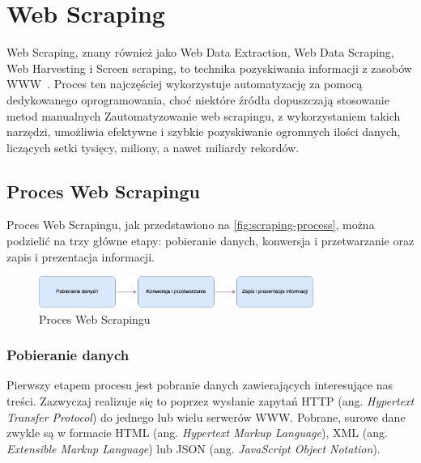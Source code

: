 \newpage


\section{Web Scraping}\label{sec:teoria}

Web Scraping, znany również jako Web Data Extraction, Web Data Scraping, Web Harvesting i Screen scraping, to technika pozyskiwania informacji z zasobów WWW~\cite{Zhao2017}.
Proces ten najczęściej wykorzystuje automatyzację za pomocą dedykowanego oprogramowania, choć niektóre źródła dopuszczają stosowanie metod manualnych\cite{applications-and-tools}
Zautomatyzowanie web scrapingu, z wykorzystaniem takich narzędzi, umożliwia efektywne i szybkie pozyskiwanie ogromnych ilości danych, liczących setki tysięcy, miliony, a nawet miliardy rekordów.

\subsection{Proces Web Scrapingu}\label{subsec:web-scraping-process}

Proces Web Scrapingu, jak przedstawiono na \autoref{fig:scraping-process}, można podzielić na trzy główne etapy: pobieranie danych, konwersja i przetwarzanie oraz zapis i prezentacja informacji\cite{persson}.

\begin{figure}[H]
    \centering
    \includegraphics[width=0.8\textwidth]{img/scraping-process}
    \caption{Proces Web Scrapingu}
    \label{fig:scraping-process}
\end{figure}

\subsubsection{Pobieranie danych}

Pierwszy etapem procesu jest pobranie danych zawierających interesujące nas treści.
Zazwyczaj realizuje się to poprzez wysłanie zapytań HTTP (ang. \emph{Hypertext Transfer Protocol}) do jednego lub wielu serwerów WWW\@.
Pobrane, surowe dane zwykle są w formacie HTML (ang. \emph{Hypertext Markup Language}), XML (ang. \emph{Extensible Markup Language}) lub JSON (ang. \emph{JavaScript Object Notation}).

